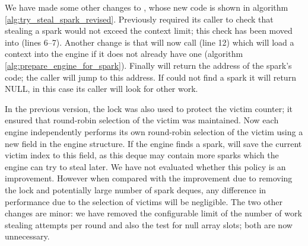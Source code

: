 We have made some other changes to \trystealspark,
whose new code is shown in algorithm \ref{alg:try_steal_spark_revised}.
Previously \trystealspark required its caller to check that stealing a spark
would not exceed the context limit;
this check has been moved into \trystealspark (lines 6--7).
Another change is that \trystealspark
will now call \prepareengineforspark (line 12)
which will load a context into the engine if it does not already have one
(algorithm \ref{alg:prepare_engine_for_spark}).
Finally \trystealspark will return the address of the spark's code;
the caller will jump to this address.
If \trystealspark could not find a spark it will return NULL,
in this case its caller will look for other work.

In the previous version,
the lock was also used to protect the victim counter;
it ensured that round-robin selection of the victim was maintained.
Now each engine independently performs its own round-robin selection of the
victim using a new field  in the engine structure.
If the engine finds a spark,
\trystealspark will save the current victim index to this field,
as this deque may contain more sparks which the engine can try to
steal later.
We have not evaluated whether this policy is an improvement.
However when compared with the improvement due to removing the lock and
potentially large number of spark deques,
any difference in performance due to the selection of victims will be
negligible.
The two other changes are minor:
we have removed the configurable limit of the number of work stealing
attempts per round and also
the test for null array slots;
both are now unnecessary.

